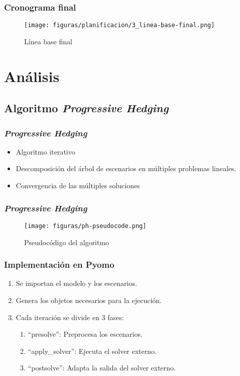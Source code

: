 \documentclass{beamer}
\begin{document}
\begin{frame}[plain]
    \frametitle{Cronograma final}
    \begin{figure}[H]
        \centerline{\texttt{[image: figuras/planificacion/3\_linea-base-final.png]}}
        \caption{Línea base final}
    \end{figure}
\end{frame}

\section{Análisis}

\subsection{Algoritmo \textit{Progressive Hedging}}

\begin{frame}
    \frametitle{\textit{Progressive Hedging}}
    \begin{itemize}
        \item Algoritmo iterativo
        \item Descomposición del árbol de escenarios en múltiples problemas lineales.
        \item Convergencia de las múltiples soluciones
    \end{itemize}
\end{frame}

\begin{frame}[plain]
    \frametitle{\textit{Progressive Hedging}}
    \begin{figure}[H]
        \centerline{\texttt{[image: figuras/ph-pseudocode.png]}}
        \caption{Pseudocódigo del algoritmo}
    \end{figure}
\end{frame}

\begin{frame}
    \frametitle{Implementación en Pyomo}
    \begin{enumerate}
        \item Se importan el modelo y los escenarios.
        \item Genera los objetos necesarios para la ejecución.
        \item Cada iteración se divide en 3 fases:
        \begin{enumerate}
            \item ``presolve'': Preprocesa los escenarios.
            \item ``apply\_solver'': Ejecuta el solver externo.
            \item ``postsolve'': Adapta la salida del solver externo.
        \end{enumerate}
    \end{enumerate}
\end{frame}
\end{document}
